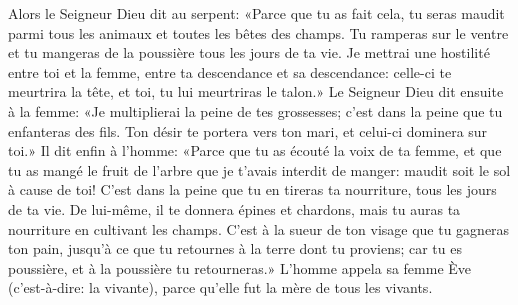 Alors le Seigneur Dieu dit au serpent:
	«Parce que tu as fait cela, tu seras maudit
	parmi tous les animaux et toutes les bêtes des champs.
	Tu ramperas sur le ventre et tu mangeras de la poussière
	tous les jours de ta vie.
Je mettrai une hostilité entre toi et la femme,
	entre ta descendance et sa descendance:
	celle-ci te meurtrira la tête, et toi, tu lui meurtriras le talon.»
Le Seigneur Dieu dit ensuite à la femme:
	«Je multiplierai la peine de tes grossesses;
	c’est dans la peine que tu enfanteras des fils.
	Ton désir te portera vers ton mari, et celui-ci dominera sur toi.»
Il dit enfin à l’homme: «Parce que tu as écouté la voix de ta femme,
	et que tu as mangé le fruit de l’arbre que je t’avais interdit de manger:
	maudit soit le sol à cause de toi!
	C’est dans la peine que tu en tireras ta nourriture,
	tous les jours de ta vie.
De lui-même, il te donnera épines et chardons,
	mais tu auras ta nourriture en cultivant les champs.
C’est à la sueur de ton visage que tu gagneras ton pain,
	jusqu’à ce que tu retournes à la terre dont tu proviens;
	car tu es poussière, et à la poussière tu retourneras.»
L’homme appela sa femme Ève (c’est-à-dire: la vivante),
	parce qu’elle fut la mère de tous les vivants.
